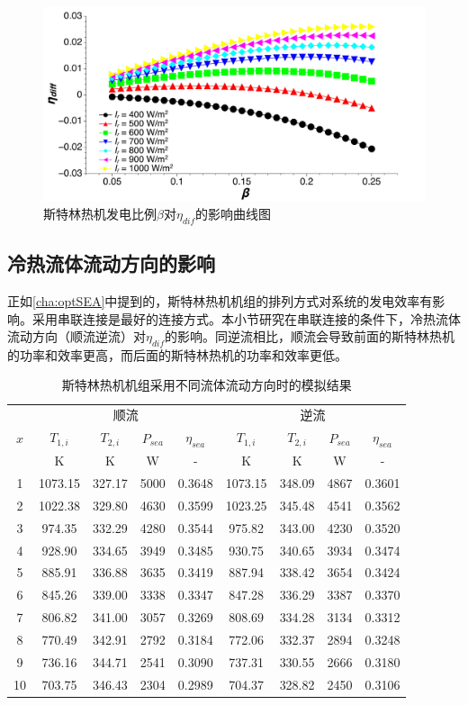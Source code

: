 \begin{figure}[ht]
\centering
	\includegraphics[width = 0.9\columnwidth, angle = 0]{fig/beta-eta_diff}
	\caption{斯特林热机发电比例$\beta$对$\eta_{dif}$的影响曲线图}
	\label{fig:beta-eta_diff}
\end{figure}

\subsection{冷热流体流动方向的影响}

正如\autoref{cha:optSEA}中提到的，斯特林热机机组的排列方式对系统的发电效率有影响。采用串联连接是最好的连接方式。本小节研究在串联连接的条件下，冷热流体流动方向（顺流逆流）对$\eta_{dif}$的影响。同逆流相比，顺流会导致前面的斯特林热机的功率和效率更高，而后面的斯特林热机的功率和效率更低。

\begin{table}[htbp]
	\caption{斯特林热机机组采用不同流体流动方向时的模拟结果}
	\centering
	\begin{tabular}{ccccccccc}
		\toprule
		\multirow{3}{*}{$x$}	&	\multicolumn{4}{c}{顺流}	&\multicolumn{4}{c}{逆流}\tabularnewline
		\cline{2-5}	\cline{6-9}
		&$T_{1,i}$&$T_{2,i}$&$P_{sea}$&$\eta_{sea}$&$T_{1,i}$&$T_{2,i}$&$P_{sea}$&$\eta_{sea}$\tabularnewline
		&K&K&W&-&K&K&W&-\tabularnewline
		\midrule
		1	&	1073.15	&	327.17	&	5000	&	0.3648	&	1073.15	&	348.09	&	4867	&	0.3601\\
		2	&	1022.38	&	329.80	&	4630	&	0.3599	&	1023.25	&	345.48	&	4541	&	0.3562\\
		3	&	974.35	&	332.29	&	4280	&	0.3544	&	975.82	&	343.00	&	4230	&	0.3520\\
		4	&	928.90	&	334.65	&	3949	&	0.3485	&	930.75	&	340.65	&	3934	&	0.3474\\
		5	&	885.91	&	336.88	&	3635	&	0.3419	&	887.94	&	338.42	&	3654	&	0.3424\\
		6	&	845.26	&	339.00	&	3338	&	0.3347	&	847.28	&	336.29	&	3387	&	0.3370\\
		7	&	806.82	&	341.00	&	3057	&	0.3269	&	808.69	&	334.28	&	3134	&	0.3312\\
		8	&	770.49	&	342.91	&	2792	&	0.3184	&	772.06	&	332.37	&	2894	&	0.3248\\
		9	&	736.16	&	344.71	&	2541	&	0.3090	&	737.31	&	330.55	&	2666	&	0.3180\\
		10	&	703.75	&	346.43	&	2304	&	0.2989	&	704.37	&	328.82	&	2450	&	0.3106\\
		\bottomrule
	\end{tabular}
	\label{tab:SEAresults}
\end{table}

